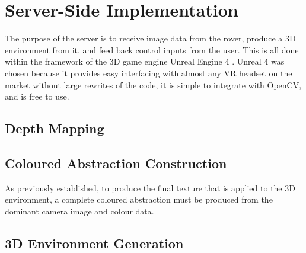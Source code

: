 \chapter{Server-Side Implementation}
\label{chapter:server}


The purpose of the server is to receive image data from the rover, produce a 3D environment from it, and feed back control inputs from the user. This is all done within the framework of the 3D game engine Unreal Engine 4 \cite{unreal}. Unreal 4 was chosen because it provides easy interfacing with almost any VR headset on the market without large rewrites of the code, it is simple to integrate with OpenCV, and is free to use.

\section{Depth Mapping}

\section{Coloured Abstraction Construction}

As previously established, to produce the final texture that is applied to the 3D environment, a complete coloured abstraction must be produced from the dominant camera image and colour data.

\section{3D Environment Generation}

